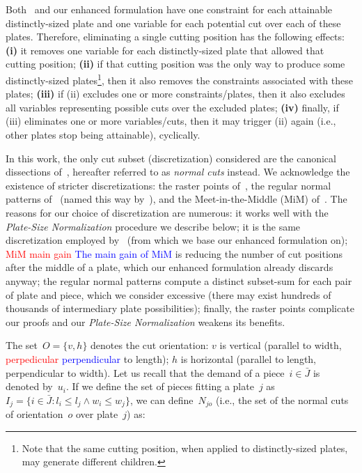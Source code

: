 \documentclass[smallextended]{svjour3}       %
\newif\iffinalversion
\newcommand{\newtext}[1]{\iffinalversion%
#1%
\else%
\textcolor{blue}{#1}%
\fi%
}
\newcommand{\oldtext}[1]{\iffinalversion%
#1%
\else%
\textcolor{red}{#1}%
\fi%
}
\begin{document}
Both~\cite{furini:2016} and our enhanced formulation have one constraint for each attainable distinctly-sized plate and one variable for each potential cut over each of these plates.
Therefore, eliminating a single cutting position has the following effects:
\textbf{(i)} it removes one variable for each distinctly-sized plate that allowed that cutting position;
\textbf{(ii)} if that cutting position was the only way to produce some distinctly-sized plates\footnote{Note that the same cutting position, when applied to distinctly-sized plates, may generate different children.}, then it also removes the constraints associated with these plates;
\textbf{(iii)} if (ii) excludes one or more constraints/plates, then it also excludes all variables representing possible cuts over the excluded plates;
\textbf{(iv)} finally, if (iii) eliminates one or more variables/cuts, then it may trigger (ii) again (i.e., other plates stop being attainable), cyclically.

In this work, the only cut subset (discretization) considered are the canonical dissections of~\cite{herz:1972}, hereafter referred to as \emph{normal cuts} instead.
We acknowledge the existence of stricter discretizations: the raster points of~\cite{terno:1987,guntram:1966}, the regular normal patterns of~\cite{boschetti:2002} (named this way by~\cite{cote:2018}), and the Meet-in-the-Middle (MiM) of~\cite{cote:2018}.
The reasons for our choice of discretization are numerous:
it works well with the \emph{Plate-Size Normalization} procedure we describe below;
it is the same discretization employed by~\cite{furini:2016} (from which we base our enhanced formulation on);
\oldtext{MiM main gain}\newtext{The main gain of MiM} is reducing the number of cut positions after the middle of a plate, which our enhanced formulation already discards anyway;
the regular normal patterns compute a distinct subset-sum for each pair of plate and piece, which we consider excessive (there may exist hundreds of thousands of intermediary plate possibilities);
finally, the raster points complicate our proofs and our \emph{Plate-Size Normalization} weakens its benefits.

The set~\(O = \{v, h\}\) denotes the cut orientation: \(v\) is vertical (parallel to width, \oldtext{perpedicular}\newtext{perpendicular} to length); \(h\) is horizontal (parallel to length, perpendicular to width).
Let us recall that the demand of a piece~\(i \in \bar{J}\) is denoted by~\(u_i\).
If we define the set of pieces fitting a plate~\(j\) as~\(I_j = \{i \in \bar{J} : l_i \leq l_j \land w_i \leq w_j \}\), we can define~\(N_{jo}\) (i.e., the set of the normal cuts of orientation~\(o\) over plate~\(j\)) as:
\end{document}
